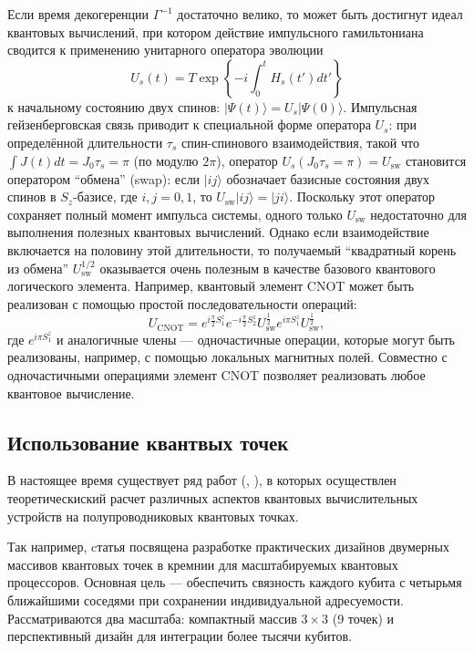 \documentclass[a4paper,14pt]{extreport} %
\begin{document}
Если время декогеренции $\Gamma^{-1}$ достаточно велико, то может быть достигнут идеал квантовых вычислений, при котором действие импульсного гамильтониана сводится к применению унитарного оператора эволюции 
\[U_s(t) = T \exp\left\{-i \int_0^t H_s(t') dt'\right\}\]
к начальному состоянию двух спинов: $|\Psi(t)\rangle = U_s |\Psi(0)\rangle$. 
Импульсная гейзенберговская связь приводит к специальной форме оператора $U_s$: 
при определённой длительности $\tau_s$ спин-спинового взаимодействия, такой что 
$\int J(t) dt = J_0 \tau_s = \pi$ (по модулю $2\pi$), 
оператор $U_s(J_0\tau_s = \pi) = U_{\text{sw}}$ становится оператором ``обмена'' (swap): 
если $|ij\rangle$ обозначает базисные состояния двух спинов в $S_z$-базисе, где $i,j = 0,1$, 
то $U_{\text{sw}}|ij\rangle = |ji\rangle$. 
Поскольку этот оператор сохраняет полный момент импульса системы, 
одного только $U_{\text{sw}}$ недостаточно для выполнения полезных квантовых вычислений. 
Однако если взаимодействие включается на половину этой длительности, 
то получаемый ``квадратный корень из обмена'' $U_{\text{sw}}^{1/2}$ оказывается очень полезным в качестве базового квантового логического элемента. 
Например, квантовый элемент CNOT может быть реализован с помощью простой последовательности операций:
\begin{equation}
U_{\text{CNOT}} =
e^{i \frac{\pi}{2} S_1^z} e^{-i \frac{\pi}{2} S_2^z}
U_{\text{sw}}^{\frac{1}{2}} e^{i\pi S_1^z} U_{\text{sw}}^{\frac{1}{2}},
\label{CNOT}
\end{equation}
где $e^{i\pi S_1^z}$ и аналогичные члены — одночастичные операции, 
которые могут быть реализованы, например, с помощью локальных магнитных полей. 
Совместно с одночастичными операциями элемент CNOT позволяет реализовать любое квантовое вычисление.

\subsection{Использование квантвых точек}
В настоящее время существует ряд работ (\cite{tadokoro2021}, \cite{shutling}), в которых осуществлен теоретическиский расчет различных аспектов квантовых вычислительных устройств на полупроводниковых квантовых точках.

Так например, cтатья \cite{tadokoro2021} посвящена разработке практических дизайнов двумерных массивов квантовых точек в кремнии для масштабируемых квантовых процессоров. Основная цель — обеспечить связность каждого кубита с четырьмя ближайшими соседями при сохранении индивидуальной адресуемости. Рассматриваются два масштаба: компактный массив $3\times 3$ (9 точек) и перспективный дизайн для интеграции более тысячи кубитов.
\end{document}
